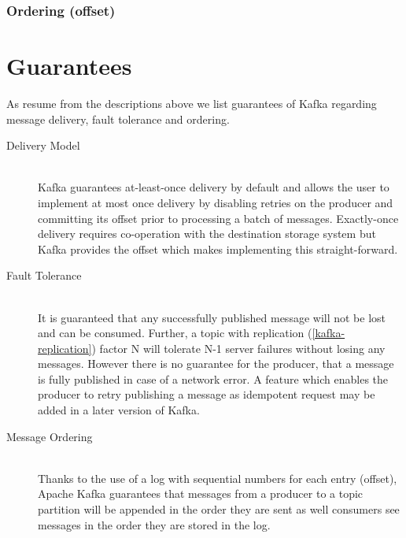 \subsubsection{Ordering (offset)}

\section{Guarantees}
\label{kafka-guarantees}
As resume from the descriptions above we list guarantees of Kafka regarding
message delivery, fault tolerance and ordering. 

\begin{description}

\item[Delivery Model] \hfill \\
    Kafka guarantees at-least-once delivery by default and allows the user to
    implement at most once delivery by disabling retries on the producer and
    committing its offset prior to processing a batch of messages. Exactly-once
    delivery requires co-operation with the destination storage system but Kafka
    provides the offset which makes implementing this
    straight-forward.\cite{apachekafka}

\item[Fault Tolerance] \hfill \\
    It is guaranteed that any successfully published message will not be lost
    and can be consumed. Further, a topic with replication
    (\ref{kafka-replication}) factor N will tolerate N-1 server failures without
    losing any messages. However there is no guarantee for the producer, that
    a message is fully published in case of a network error. A feature which
    enables the producer to retry publishing a message as idempotent
     request may be added in a later version of Kafka. \cite{apachekafka}

\item[Message Ordering] \hfill \\
    Thanks to the use of a log with sequential numbers for each entry (offset),
    Apache Kafka guarantees that messages from a producer to a topic partition
    will be appended in the order they are sent as well consumers see messages
    in the order they are stored in the log. \cite{apachekafka}

\end{description}

